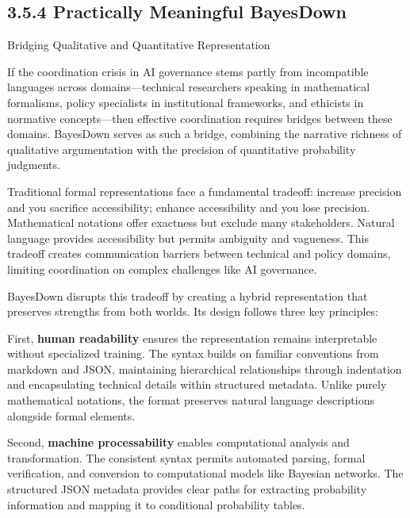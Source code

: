 \documentclass[
  11pt,
  letterpaper,
]{book}
\newenvironment{Shaded}{\begin{snugshade}}{\end{snugshade}}
\newcommand{\ErrorTok}[1]{\textcolor[rgb]{0.68,0.00,0.00}{#1}}
\begin{document}
\begin{landscape}
\begin{Shaded}
\end{Shaded}

\subsection*{3.5.4 Practically Meaningful
BayesDown}\label{practically-meaningful-bayesdown}

Bridging Qualitative and Quantitative Representation

If the coordination crisis in AI governance stems partly from
incompatible languages across domains---technical researchers speaking
in mathematical formalisms, policy specialists in institutional
frameworks, and ethicists in normative concepts---then effective
coordination requires bridges between these domains. BayesDown serves as
such a bridge, combining the narrative richness of qualitative
argumentation with the precision of quantitative probability judgments.

Traditional formal representations face a fundamental tradeoff: increase
precision and you sacrifice accessibility; enhance accessibility and you
lose precision. Mathematical notations offer exactness but exclude many
stakeholders. Natural language provides accessibility but permits
ambiguity and vagueness. This tradeoff creates communication barriers
between technical and policy domains, limiting coordination on complex
challenges like AI governance.

BayesDown disrupts this tradeoff by creating a hybrid representation
that preserves strengths from both worlds. Its design follows three key
principles:

First, \textbf{human readability} ensures the representation remains
interpretable without specialized training. The syntax builds on
familiar conventions from markdown and JSON, maintaining hierarchical
relationships through indentation and encapsulating technical details
within structured metadata. Unlike purely mathematical notations, the
format preserves natural language descriptions alongside formal
elements.

Second, \textbf{machine processability} enables computational analysis
and transformation. The consistent syntax permits automated parsing,
formal verification, and conversion to computational models like
Bayesian networks. The structured JSON metadata provides clear paths for
extracting probability information and mapping it to conditional
probability tables.


\end{landscape}
\end{document}
